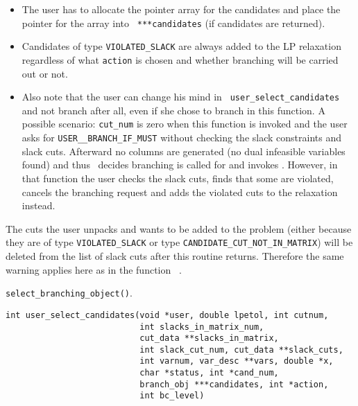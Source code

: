 \item[Notes:] \hfill
\begin{itemize}
	\item The user has to allocate the pointer array for the
	candidates and place the pointer for the array into {\tt
	***candidates} (if candidates are returned).

	\item Candidates of type {\tt VIOLATED\_SLACK} are always
	added to the LP relaxation regardless of what {\tt action} is
	chosen and whether branching will be carried out or not.

	\item Also note that the user can change his mind in 
	{\tt {}
	{user_select_candidates}} and not branch after all, even if
	she chose to branch in this function. A possible scenario:
	{\tt cut\_num} is zero when this function is invoked and the
	user asks for {\tt USER\_\_BRANCH\_IF\_MUST} without checking
	the slack constraints and slack cuts. Afterward no columns
	are generated (no dual infeasible variables found) and thus
	\BB\ decides branching is called for and invokes 
	{\tt {}}. 
	However, in that function the
	user checks the slack cuts, finds that some are violated,
	cancels the branching request and adds the violated cuts to
	the relaxation instead.
\end{itemize}

\item [\bf Warning:] 

The cuts the user unpacks and wants to be added to the
problem (either because they are of type {\tt VIOLATED\_SLACK} or type
{\tt CANDIDATE\_CUT\_NOT\_IN\_MATRIX}) will be deleted from the list
of slack cuts after this routine returns. Therefore the same
warning applies here as in the function {\tt 
{}}.

\item[Wrapper invoked from:] {\tt select\_branching\_object()}.

\ed

\label{user_select_candidates}
\begin{verbatim}
int user_select_candidates(void *user, double lpetol, int cutnum, 
                           int slacks_in_matrix_num,
                           cut_data **slacks_in_matrix,
                           int slack_cut_num, cut_data **slack_cuts,
                           int varnum, var_desc **vars, double *x, 
                           char *status, int *cand_num, 
                           branch_obj ***candidates, int *action,
                           int bc_level)
\end{verbatim}

